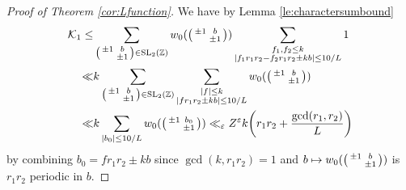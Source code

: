 \documentclass[12pt]{amsart}
\theoremstyle{definition}
\theoremstyle{remark}
\numberwithin{equation}{section}
\newcommand{\Z}{{\mathbb Z}}
\newcommand{\1}{{\mathbf 1}}
\newcommand{\eps}{\varepsilon}
\newcommand{\SL}{\operatorname{SL}_2}
\begin{document}
\begin{proof}[Proof of Theorem \ref{cor:Lfunction}]
We have by Lemma \ref{le:charactersumbound} 
\begin{align*}
   \mathcal{K}_{1} \leq &   \sum_{\smqty(\pm 1 & b \\ & \pm 1) \in \SL(\Z)} w_0(\smqty(\pm 1 & b \\ & \pm 1) ) \sum_{\substack{ f_1,f_2 \leq k \\ |f_1 r_1 r_2 - f_2 r_1r_2 \pm k b| \leq 10 /L}} 1  \\
   \ll &  k  \sum_{\smqty(\pm 1 & b \\ & \pm 1) \in \SL(\Z)}  \sum_{\substack{ |f| \leq k \\ |f r_1 r_2 \pm k b| \leq 10 /L}} w_0(\smqty(\pm 1 & b \\ & \pm 1) ) \\
   \ll & k \sum_{|b_0| \leq 10 /L} w_0(\smqty(\pm 1 & b_0 \\ & \pm 1) ) \ll_\eps Z^{\eps} k \bigg(r_1 r_2 +  \frac{\gcd(r_1,r_2)}{L }\bigg)
\end{align*}
by combining $b_0 = f r_1 r_2  \pm k b$ since $\gcd(k,r_1r_2)=1$ and $b \mapsto w_0(\smqty(\pm 1 & b \\ & \pm 1) )$ is $r_1r_2$ periodic in $b$. 


\end{proof}
\end{document}
